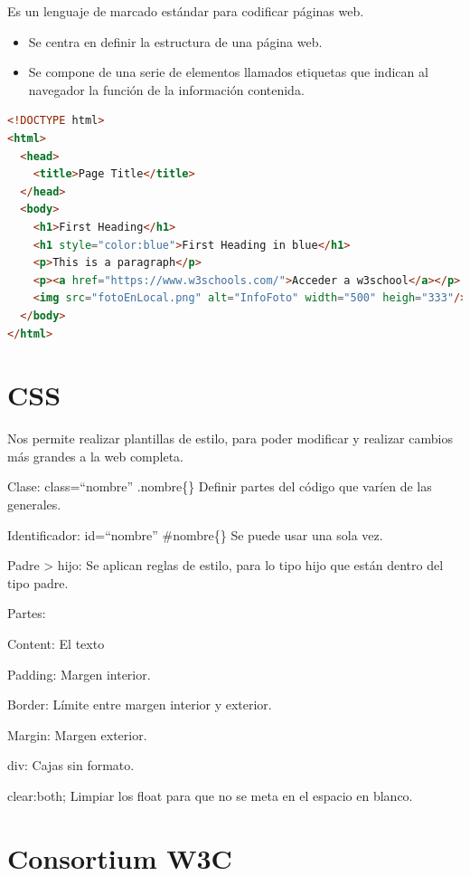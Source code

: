 \documentclass[12pt, twoside, openright]{report} %
\begin{document}
  Es un lenguaje de marcado estándar para codificar páginas web.

  \begin{itemize}
  
  \item
    Se centra en definir la estructura de una página web.
  \item
    Se compone de una serie de elementos llamados etiquetas que indican
    al navegador la función de la información contenida.
  \end{itemize}
\pagebreak
\begin{lstlisting}[language=HTML]
<!DOCTYPE html>
<html>
  <head>
    <title>Page Title</title>
  </head>
  <body>
    <h1>First Heading</h1>
    <h1 style="color:blue">First Heading in blue</h1>
    <p>This is a paragraph</p>
    <p><a href="https://www.w3schools.com/">Acceder a w3school</a></p>
    <img src="fotoEnLocal.png" alt="InfoFoto" width="500" heigh="333"/>
  </body>
</html>
\end{lstlisting}

\section{CSS}

  Nos permite realizar plantillas de estilo, para poder modificar y
  realizar cambios más grandes a la web completa.

  Clase: class=``nombre'' .nombre\{\} Definir partes del código que
  varíen de las generales.

  Identificador: id=``nombre'' \#nombre\{\} Se puede usar una sola vez.

  Padre \textgreater{} hijo: Se aplican reglas de estilo, para lo tipo
  hijo que están dentro del tipo padre.

  Partes:

  Content: El texto

  Padding: Margen interior.

  Border: Límite entre margen interior y exterior.

  Margin: Margen exterior.

  div: Cajas sin formato.

  clear:both; Limpiar los float para que no se meta en el espacio en
  blanco.

\section{Consortium W3C}
\end{document}
